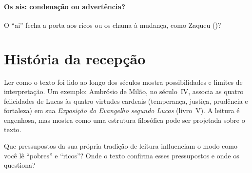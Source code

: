 \paragraph{Os ais: condenação ou advertência?} O \enquote{ai} fecha a porta
aos ricos ou os chama à mudança, como Zaqueu ()?

\section{História da recepção}

Ler como o texto foi lido ao longo dos séculos mostra possibilidades e
limites de interpretação. Um exemplo: Ambrósio de Milão, no século~IV,
associa as quatro felicidades de Lucas às quatro virtudes cardeais
(temperança, justiça, prudência e fortaleza) em sua \emph{Exposição do
Evangelho segundo Lucas} (livro~V). A leitura é engenhosa, mas mostra
como uma estrutura filosófica pode ser projetada sobre o texto.

\begin{pergunta}
Que pressupostos da sua própria tradição de leitura influenciam o modo como
você lê \enquote{pobres} e \enquote{ricos}? Onde o texto confirma esses
pressupostos e onde os questiona?
\end{pergunta}
